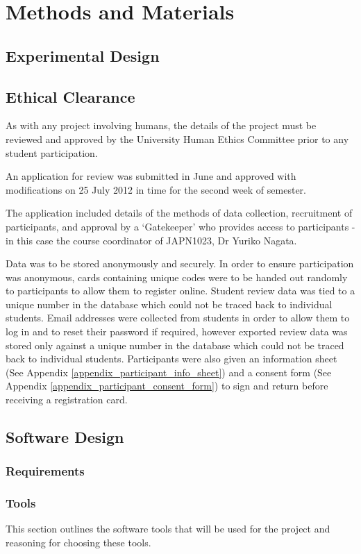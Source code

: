 \section{Methods and Materials}
\label{methods}
\subsection{Experimental Design}
\subsection{Ethical Clearance}
\label{methods_ethical}
As with any project involving humans, the details of the project must be reviewed and 
approved by the University Human Ethics Committee prior to any student participation.

An application for review was submitted in June and approved with modifications
on 25 July 2012 in time for the second week of semester.

The application included details of the methods of data collection, recruitment of participants,
and approval by a `Gatekeeper' who provides access to participants - in this case the course coordinator of JAPN1023, Dr Yuriko Nagata.

Data was to be stored anonymously and securely. In order to ensure participation was anonymous,
cards containing unique codes were to be handed out randomly to participants to allow them to
register online. Student review data was tied to a unique number in the database which could
not be traced back to individual students. Email addresses were collected from students in order
to allow them to log in and to reset their password if required, however exported review data was
stored only against a unique number in the database which could not be traced back to individual
students. Participants were also given an information sheet (See Appendix
\ref{appendix_participant_info_sheet}) and a consent form (See Appendix
\ref{appendix_participant_consent_form}) to sign and return before receiving a registration card.

\subsection{Software Design}
\label{methods_softwaredesign}
\subsubsection{Requirements}

\subsubsection{Tools}
This section outlines the software tools that will be used for the project and reasoning for
choosing these tools.
